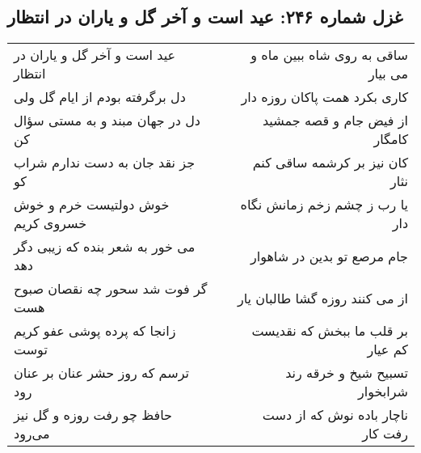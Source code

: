 \begin{center}
\section*{غزل شماره ۲۴۶: عید است و آخر گل و یاران در انتظار}
\label{sec:sh246}
\begin{longtable}{l p{0.5cm} r}
عید است و آخر گل و یاران در انتظار
&&
ساقی به روی شاه ببین ماه و می بیار
\\
دل برگرفته بودم از ایام گل ولی
&&
کاری بکرد همت پاکان روزه دار
\\
دل در جهان مبند و به مستی سؤال کن
&&
از فیض جام و قصه جمشید کامگار
\\
جز نقد جان به دست ندارم شراب کو
&&
کان نیز بر کرشمه ساقی کنم نثار
\\
خوش دولتیست خرم و خوش خسروی کریم
&&
یا رب ز چشم زخم زمانش نگاه دار
\\
می خور به شعر بنده که زیبی دگر دهد
&&
جام مرصع تو بدین در شاهوار
\\
گر فوت شد سحور چه نقصان صبوح هست
&&
از می کنند روزه گشا طالبان یار
\\
زانجا که پرده پوشی عفو کریم توست
&&
بر قلب ما ببخش که نقدیست کم عیار
\\
ترسم که روز حشر عنان بر عنان رود
&&
تسبیح شیخ و خرقه رند شرابخوار
\\
حافظ چو رفت روزه و گل نیز می‌رود
&&
ناچار باده نوش که از دست رفت کار
\\
\end{longtable}
\end{center}
